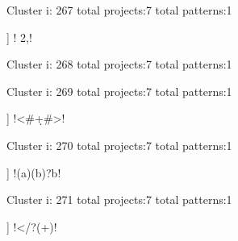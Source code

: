 Cluster i: 267
total projects:7
total patterns:1
\begin{multicols}{1}
\begin{description}[noitemsep,topsep=0pt]
\item [[7] ] \cverb! {2,}\n!
\end{description}
\end{multicols}







Cluster i: 268
total projects:7
total patterns:1
\begin{multicols}{1}
\begin{description}[noitemsep,topsep=0pt]
\item [[7] ] \cverb!-[ -]*$!
\end{description}
\end{multicols}







Cluster i: 269
total projects:7
total patterns:1
\begin{multicols}{1}
\begin{description}[noitemsep,topsep=0pt]
\item [[7] ] \cverb!<#\d+#>!
\end{description}
\end{multicols}







Cluster i: 270
total projects:7
total patterns:1
\begin{multicols}{1}
\begin{description}[noitemsep,topsep=0pt]
\item [[7] ] \cverb!(a)(b)?b!
\end{description}
\end{multicols}







Cluster i: 271
total projects:7
total patterns:1
\begin{multicols}{1}
\begin{description}[noitemsep,topsep=0pt]
\item [[7] ] \cverb!</?(\w+)!
\end{description}
\end{multicols}








